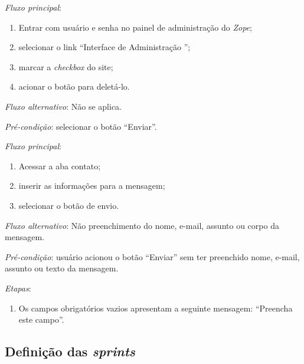 \noindent \textit{Fluxo principal}:

\begin{enumerate}
    \item Entrar com usuário e senha no painel de administração do \textit{Zope};
    \item selecionar o link ``Interface de Administração '';
    \item marcar a \textit{checkbox} do site;
    \item acionar o botão para deletá-lo.
\end{enumerate}

\noindent \textit{Fluxo alternativo}: Não se aplica.



\vspace{0.7cm}

\noindent \textit{Pré-condição}: selecionar o botão ``Enviar''.

\noindent \textit{Fluxo principal}:

\begin{enumerate}
    \item Acessar a aba contato;
    \item inserir as informações para a mensagem;
    \item selecionar o botão de envio.
\end{enumerate}

\noindent \textit{Fluxo alternativo}: Não preenchimento do nome, e-mail, assunto ou corpo da mensagem.

\noindent \textit{Pré-condição}: usuário acionou o botão ``Enviar'' sem ter preenchido nome, e-mail, assunto ou texto da mensagem.

\noindent \textit{Etapas}:

\begin{enumerate}
    \item Os campos obrigatórios vazios apresentam a seguinte mensagem: ``Preencha este campo''.
\end{enumerate}



\hspace{2.5cm}
\subsection{Definição das \textit{sprints}}
\label{subsec:sprints}
\hspace{2.5cm}

